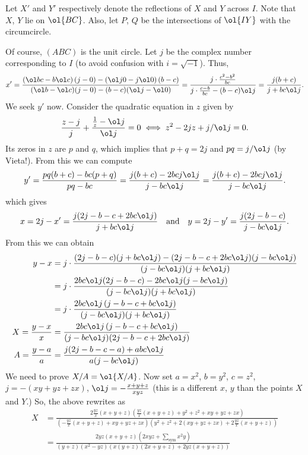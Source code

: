 \documentclass[11pt]{scrartcl}
\begin{document}
\begin{soln}
  Let $X'$ and $Y'$ respectively denote the reflections of $X$ and $Y$ across $I$.
  Note that $X$, $Y$ lie on $\ol{BC}$.
  Also, let $P$, $Q$ be the intersections of $\ol{IY}$ with the circumcircle.

  Of course, $(ABC)$ is the unit circle.
  Let $j$ be the complex number corresponding to $I$ (to avoid confusion with $i = \sqrt{-1}$).
  Thus,
  \[ x' = \frac{\left( \ol b c - b \ol c \right)(j-0) - \left( \ol j 0 - j \ol 0 \right)(b-c)}{(\ol b - \ol c)(j-0) - (b-c) (\ol j - \ol 0)}
    = \frac{j \cdot \frac{c^2-b^2}{bc}}{j \cdot \frac{c-b}{bc} - (b-c) \ol j}
    = \frac{j(b+c)}{j + bc \ol j} . \]
  We seek $y'$ now. Consider the quadratic equation in $z$ given by
  \[ \frac{z-j}{j} + \frac{\frac1z - \ol j}{\ol j} = 0
    \iff z^2 - 2j z + j / \ol j = 0.\]
  Its zeros in $z$ are $p$ and $q$,
  which implies that $p+q = 2j$ and $pq = j / \ol j$
  (by Vieta!).
  From this we can compute
  \[ y' = \frac{pq(b+c)-bc(p+q)}{pq-bc}
    = \frac{j(b+c)-2bcj \ol j}{j - bc \ol j} = \frac{j(b+c)-2bcj \ol j}{j-bc\ol j}. \]
  which gives
  \[
    x = 2j - x' = \frac{j(2j-b-c+2bc \ol j)}{j + bc \ol j}
    \quad\text{and}\quad
    y = 2j - y' = \frac{j(2j-b-c)}{j - bc \ol j}.
  \]
  From this we can obtain
  \begin{align*}
    y-x &= j \cdot \frac{(2j-b-c)(j+bc\ol j)-(2j-b-c+2bc\ol j)(j-bc \ol j)}{(j-bc \ol j)(j+bc \ol j)} \\
    &= j \cdot \frac{2bc \ol j(2j-b-c)-2bc \ol j(j  - bc \ol j)}{(j-bc\ol j)(j+bc\ol j)} \\
    &= j \cdot \frac{2bc \ol j \left( j-b-c+bc \ol j \right)}{(j-bc\ol j)(j+bc\ol j)} \\
    X = \frac{y-x}{x} &= \frac{2bc \ol j \left( j-b-c+bc \ol j \right)}{(j-bc\ol j)(2j-b-c+2bc\ol j)} \\
    A = \frac{y-a}{a} &= \frac{j(2j-b-c-a)+abc\ol j}{a(j-bc\ol j)}
  \end{align*}
  We need to prove $X/A = \ol{X/A}$.
  Now set $a=x^2$, $b=y^2$, $c=z^2$, $j=-(xy+yz+zx)$, $\ol j = -\frac{x+y+z}{xyz}$
  (this is a different $x$, $y$ than the points $X$ and $Y$.)
  So, the above rewrites as
  \begin{align*}
    X &= \frac{2\frac{yz}{x}(x+y+z)(\frac{yz}{x}(x+y+z)+y^2+z^2+xy+yz+zx)}{\left( -\frac{yz}{x}(x+y+z)+xy+yz+zx \right)\left( y^2+z^2+2(xy+yz+zx)+2\frac{yz}{x}(x+y+z) \right)} \\
    &= \frac{2yz(x+y+z)\left( 2xyz+\sum_{\text{sym}} x^2y \right)}{(y+z)(x^2-yz)\left( x(y+z)(2x+y+z)+2yz(x+y+z) \right)} \\

\end{align*}
\end{soln}
\end{document}
